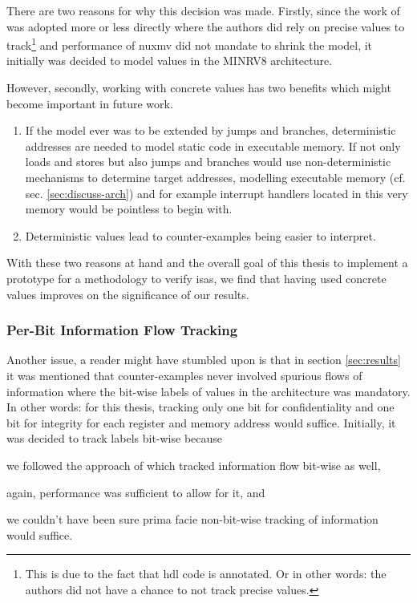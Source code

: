 There are two reasons for why this decision was made.
Firstly, since the work of \citeauthor{Ferraiuolo17} \cite{Ferraiuolo17} was adopted more or less directly where the authors did rely on precise values to track\footnote{%
    This is due to the fact that \gls{hdl} code is annotated.
    Or in other words: the authors did not have a chance to not track precise values.
} and performance of \gls{nuxmv} did not mandate to shrink the model, it initially was decided to model values in the MINRV8 architecture.

However, secondly, working with concrete values has two benefits which might become important in future work.
\begin{enumerate}
    \item If the model ever was to be extended by jumps and branches, deterministic addresses are needed to model static code in executable memory.
    If not only loads and stores but also jumps and branches would use non-deterministic mechanisms to determine target addresses, modelling executable memory (cf. sec. \ref{sec:discuss-arch}) and for example interrupt handlers located in this very memory would be pointless to begin with.
    \item Deterministic values lead to counter-examples being easier to interpret.
\end{enumerate}

With these two reasons at hand and the overall goal of this thesis to implement a prototype for a methodology to verify \glspl{isa}, we find that having used concrete values improves on the significance of our results.

\subsubsection{Per-Bit Information Flow Tracking}

Another issue, a reader might have stumbled upon is that in section \ref{sec:results} it was mentioned that counter-examples never involved spurious flows of information where the bit-wise labels of values in the architecture was mandatory.
In other words: for this thesis, tracking only one bit for confidentiality and one bit for integrity for each register and memory address would suffice.
Initially, it was decided to track labels bit-wise because \begin{enumerate*}[label=\alph*)]
    \item we followed the approach of \citeauthor{Ferraiuolo17} \cite{Ferraiuolo17} which tracked information flow bit-wise as well,
    \item again, performance was sufficient to allow for it, and
    \item we couldn't have been sure prima facie non-bit-wise tracking of information would suffice.
\end{enumerate*}

